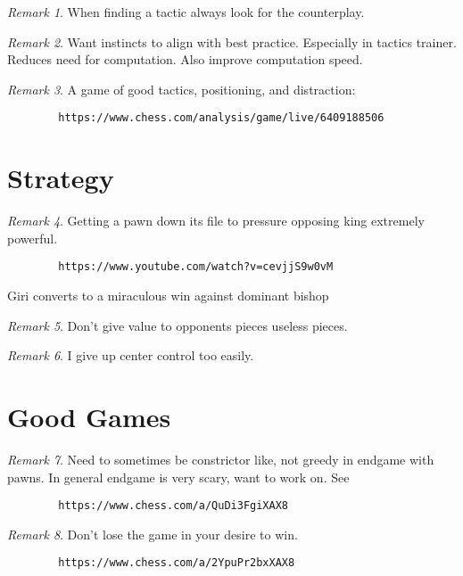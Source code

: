 \documentclass[11pt]{article}
\theoremstyle{remark}
\newtheorem{remark}{Remark}
\begin{document}
\begin{remark}
	When finding a tactic always look for the counterplay.
\end{remark}

\begin{remark}
	Want instincts to align with best practice. Especially in tactics trainer. Reduces need for computation. Also improve computation speed.
\end{remark}

\begin{remark}
	A game of good tactics, positioning, and distraction: 
	\begin{verbatim}
		https://www.chess.com/analysis/game/live/6409188506
	\end{verbatim}
\end{remark}

\section{Strategy}

\begin{remark}
	Getting a pawn down its file to pressure opposing king extremely powerful. 
	\begin{verbatim}
		https://www.youtube.com/watch?v=cevjjS9w0vM
	\end{verbatim}
	Giri converts to a miraculous win against dominant bishop
\end{remark}

\begin{remark}
	Don't give value to opponents pieces useless pieces.
\end{remark}

\begin{remark}
	I give up center control too easily.
\end{remark}

\section{Good Games}

\begin{remark}
	Need to sometimes be constrictor like, not greedy in endgame with pawns. In general endgame is very scary, want to work on. See
	\begin{verbatim}
		https://www.chess.com/a/QuDi3FgiXAX8
	\end{verbatim}
\end{remark}

\begin{remark}
	Don't lose the game in your desire to win.
	\begin{verbatim}
		https://www.chess.com/a/2YpuPr2bxXAX8
	\end{verbatim}
\end{remark}
\end{document}
